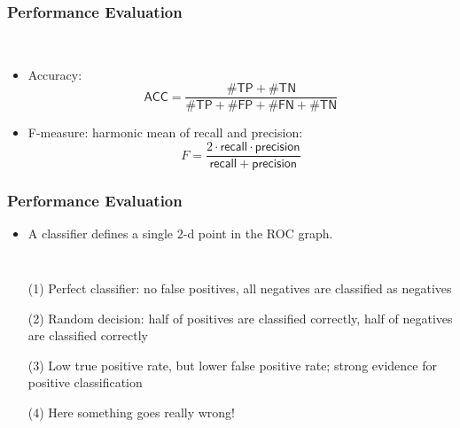 \begin{frame}[fragile]
   \frametitle{Performance Evaluation \cont}

    \\[.3cm]

   \begin{itemize}
      \item Accuracy:
        {\small
        \begin{displaymath}
           \mathsf{ACC} = \frac{\#\mathsf{TP} + \#\mathsf{TN}}{\#\mathsf{TP} + \#\mathsf{FP} + \#\mathsf{FN} + \#\mathsf{TN}}
        \end{displaymath}
        }
        \spread

      \item F-measure: harmonic mean of recall and precision:
        {\small
        \begin{displaymath}
           F = \frac{2 \cdot \mathsf{recall} \cdot \mathsf{precision}}{\mathsf{recall} + \mathsf{precision}}
        \end{displaymath}
        }
   \end{itemize}
\end{frame}


\begin{frame}[fragile]
   \frametitle{Performance Evaluation \cont}


   \begin{itemize}
      \item A classifier defines a single 2-d point in the ROC graph. \\[.7cm]
   \end{itemize}

   \begin{columns}
      \resizebox{1.4\linewidth}{!}{
         
      }
      \footnotesize
      \vspace{-4.0cm}
      \begin{itemize}
         \item[(1)] Perfect classifier: no false positives, all negatives are classified as negatives
         \item[(2)] Random decision: half of positives are classified correctly, half of negatives are classified
           correctly
         \item[(3)] Low true positive rate, but lower false positive rate; strong evidence for positive classification
         \item[(4)] Here something goes really wrong!
      \end{itemize}
   \end{columns}
\end{frame}



